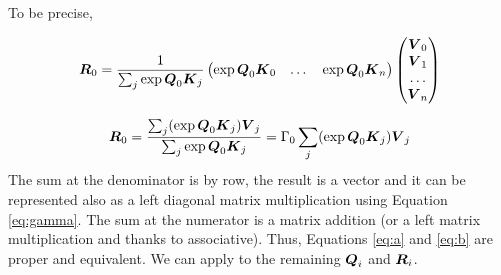 \documentclass[journal]{IEEEtran}
\begin{document}
To be precise, 

\begin{equation}
  \label{eq:a}
  \Vc{R}_0 = \frac{1}{\sum_j\exp{\Vc{Q}_0\Vc{K}_j}}
  \begin{pmatrix}
    \exp{\Vc{Q}_0\Vc{K}_0} &  \dots &\exp{\Vc{Q}_0\Vc{K}_n} 
  \end{pmatrix}
  \begin{pmatrix}
    \Vc{V}_0  \\
    \Vc{V}_1  \\
    \dots \\
    \Vc{V}_n
  \end{pmatrix} 
\end{equation}

\begin{equation}
  \label{eq:b}
  \Vc{R}_0 = \frac{\sum_j(\exp{\Vc{Q}_0\Vc{K}_j})\Vc{V}_j}{\sum_j\exp{\Vc{Q}_0\Vc{K}_j}}=\Gamma_0\sum_j(\exp{\Vc{Q}_0\Vc{K}_j})\Vc{V}_j
\end{equation}
The sum at the denominator is by row, the result is a vector and it
can be represented also as a left diagonal matrix multiplication using
Equation \ref{eq:gamma}.  The sum at the numerator is a matrix
addition (or a left matrix multiplication and thanks to
associative). Thus, Equations \ref{eq:a} and \ref{eq:b} are proper and
equivalent. We can apply to the remaining ${\boldsymbol Q}_i$ and ${\boldsymbol R}_i$.
\end{document}
